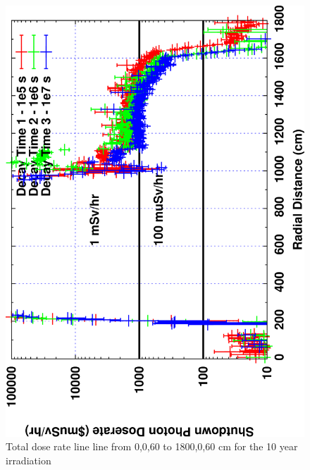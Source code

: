 \documentclass[12pt]{article}
\begin{document}
\begin{figure}[ht!]
\centering
\includegraphics[clip,scale=0.12,angle=-90]{../plots/photon_lineout/10yr/b4c_10yr.png}
\caption{Total dose rate line line from 0,0,60 to 1800,0,60 cm for the 10 year irradiation}
\label{fig:photons_10y_b4c_dose}
\end{figure}
\clearpage
\newpage
\end{document}
